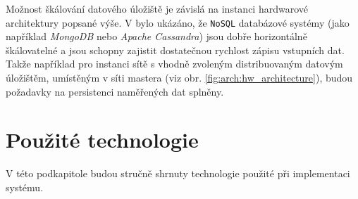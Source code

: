 Možnost škálování datového úložiště je závislá na instanci hardwarové architektury popsané výše. V \cite{gandini2014performance} bylo ukázáno, že \texttt{NoSQL} databázové systémy (jako například \textit{MongoDB} nebo \textit{Apache Cassandra}) jsou dobře horizontálně škálovatelné a jsou schopny zajistit dostatečnou rychlost zápisu vstupních dat. Takže například pro instanci sítě s vhodně zvoleným distribuovaným datovým úložištěm, umístěným v síti mastera (viz obr. \ref{fig:arch:hw_architecture}), budou požadavky na persistenci naměřených dat splněny.

\section{Použité technologie}\label{chap:arch:technologie}
V této podkapitole budou stručně shrnuty technologie použité při implementaci systému.

